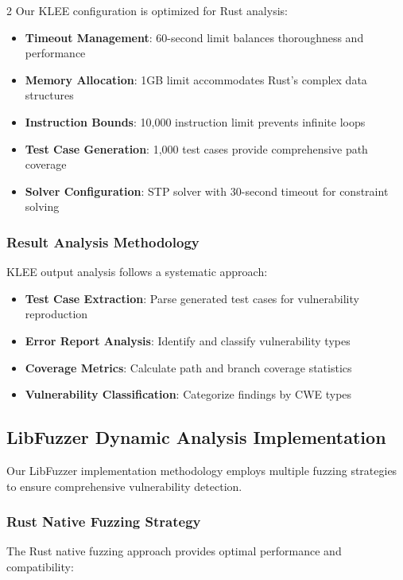 \documentclass[12pt,a4paper]{article}
\begin{document}
\begin{multicols}{2}
Our KLEE configuration is optimized for Rust analysis:

\begin{itemize}
    \item \textbf{Timeout Management}: 60-second limit balances thoroughness and performance
    \item \textbf{Memory Allocation}: 1GB limit accommodates Rust's complex data structures
    \item \textbf{Instruction Bounds}: 10,000 instruction limit prevents infinite loops
    \item \textbf{Test Case Generation}: 1,000 test cases provide comprehensive path coverage
    \item \textbf{Solver Configuration}: STP solver with 30-second timeout for constraint solving
\end{itemize}

\subsubsection{Result Analysis Methodology}

KLEE output analysis follows a systematic approach:

\begin{itemize}
    \item \textbf{Test Case Extraction}: Parse generated test cases for vulnerability reproduction
    \item \textbf{Error Report Analysis}: Identify and classify vulnerability types
    \item \textbf{Coverage Metrics}: Calculate path and branch coverage statistics
    \item \textbf{Vulnerability Classification}: Categorize findings by CWE types
\end{itemize}

\subsection{LibFuzzer Dynamic Analysis Implementation}

Our LibFuzzer implementation methodology employs multiple fuzzing strategies to ensure comprehensive vulnerability detection.

\subsubsection{Rust Native Fuzzing Strategy}

The Rust native fuzzing approach provides optimal performance and compatibility:


\end{multicols}
\end{document}
